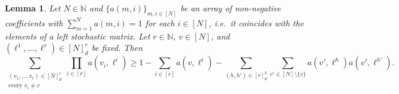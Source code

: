\documentclass[a4paper,11pt]{article}
\newtheorem{lem}{Lemma}
\theoremstyle{definition}
\newcommand{\bbN}{\mathbb{N}}
\begin{document}
\begin{lem}\label{moehle_lb_lemma}
Let $N \in \bbN$ and $\{ a(m, i) \}_{m, i \in [N]}$ be an array of non-negative coefficients with $\sum_{m = 1}^N a(m, i) = 1$ for each $i \in [ N ]$, i.e.\ it coincides with the elements of a left stochastic matrix.
Let $r \in \bbN$, $v \in [ N ]$, and $( \ell^1, \ldots, \ell^r ) \in [ N ]_d^r$ be fixed.
Then
\begin{equation}
\sum_{ \substack{ ( v_1, \ldots, v_r ) \in [ N ]_d^r \\ \text{every } v_i \neq v } } \prod_{ i \in [ r ] } a( v_i, \ell^i ) \geq 1 - \sum_{ i \in [ r ] } a( v, \ell^i ) - \sum_{ ( h, h' ) \in [ r ]_d^2 } \sum_{ v' \in [ N ] \setminus \{ v \} } a( v', \ell^h ) a( v', \ell^{ h' } ). \label{eq:lem2}
\end{equation}
\end{lem}
\end{document}
